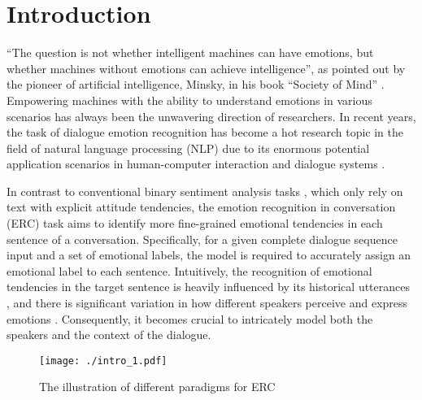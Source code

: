 \documentclass[conference]{IEEEtran}
\begin{document}
\section{Introduction}
``The question is not whether intelligent machines can have emotions, but whether machines without emotions can achieve intelligence'', as pointed out by the pioneer of artificial intelligence, Minsky, in his book ``Society of Mind'' \cite{minsky1988society}.
Empowering machines with the ability to understand emotions in various scenarios has always been the unwavering direction of researchers. In recent years, the task of dialogue emotion recognition has become a hot research topic in the field of natural language processing (NLP) due to its enormous potential application scenarios in human-computer interaction \cite{mackenzie2012human} and dialogue systems \cite{ma2020survey}.


In contrast to conventional binary sentiment analysis tasks \cite{pontiki2016semeval} , which only rely on text with explicit attitude tendencies, the emotion recognition in conversation (ERC) task aims to identify more fine-grained emotional tendencies in each sentence of a conversation. 
Specifically, for a given complete dialogue sequence input and a set of emotional labels, the model is required to accurately assign an emotional label to each sentence. Intuitively, the recognition of emotional tendencies in the target sentence is heavily influenced by its historical utterances \cite{yingjian2023emotionic}, and there is significant variation in how different speakers perceive and express emotions \cite{shen2021directed}. Consequently, it becomes crucial to intricately model both the speakers and the context of the dialogue.


\begin{figure}[t]
\centering
\texttt{[image: ./intro\_1.pdf]} \caption{The illustration of different paradigms for ERC}
\label{fig1}
\end{figure}
\end{document}
